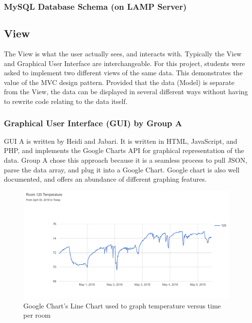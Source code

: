 \documentclass{article}
\begin{document}
			\subsubsection{MySQL Database Schema (on LAMP Server)}
			
		\subsection{View}
			The View is what the user actually sees, and interacts with. Typically the View and Graphical User Interface are interchangeable.
			For this project, students were asked to implement two different views of the same data. This demonstrates the value of
			the MVC design pattern. Provided that the data (Model) is separate from the View, the data can be displayed in several different
			ways without having to rewrite code relating to the data itself.		
		
			\subsubsection{Graphical User Interface (GUI) by Group A}
				GUI A is written by Heidi and Jabari. It is written in HTML, JavaScript, and PHP, and implements the Google Charts API
				for graphical representation of the data. Group A chose this approach because it is a seamless process to pull JSON, parse the data 
				array, and plug it into a Google Chart. Google chart is also well documented, and offers an abundance of different graphing features.
				
				\begin{figure}[H]
					\begin{center}
						\includegraphics[scale=.4]{TempVersusTime.PNG}			
					\end{center}
					\captionsetup{labelformat=empty}
					\caption{Google Chart's Line Chart used to graph temperature versus time per room}
				\end{figure}				
				
\end{document}
